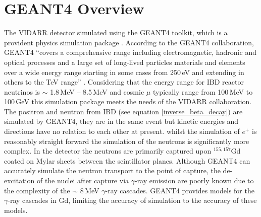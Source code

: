 \section{GEANT4 Overview}\label{sec:GEANT4Simulation_g4Overview}
The VIDARR detector simulated using the GEANT4 toolkit, which is a provident physics simulation package \cite{Agostinelli:2002hh}. According to the GEANT4 collaboration, GEANT4 ``covers a comprehensive range including electromagnetic, hadronic and optical processes and a large set of long-lived particles materials and elements over a wide energy range starting in some cases from 250\,eV and extending in others to the TeV range'' \cite{Agostinelli:2002hh}. Considering that the energy range for IBD reactor neutrinos is $\sim$ 1.8\,MeV -- 8.5\,MeV \cite{Mueller_2011} and cosmic $\mu$ typically range from 100\,MeV to 100\,GeV \cite{ieee_cry_2007} this simulation package meets the needs of the VIDARR collaboration. The positron and neutron from IBD (see equation \ref{inverse_beta_decay}) are simulated by GEANT4, they are in the same event but kinetic energies and directions have no relation to each other at present. whilst the simulation of $e^+$ is reasonably straight forward the simulation of the neutrons is significantly more complex. In the detector the neutrons are primarily captured upon $^{155,157}$Gd coated on Mylar sheets between the scintillator planes. Although GEANT4 can accurately simulate the neutron transport to the point of capture, the de-excitation of the nuclei after capture via $\gamma$-ray emission are poorly known due to the complexity of the $\sim$ 8\,MeV $\gamma$-ray cascades. GEANT4 provides models for the $\gamma$-ray cascades in Gd, limiting the accuracy of simulation to the accuracy of these models.
